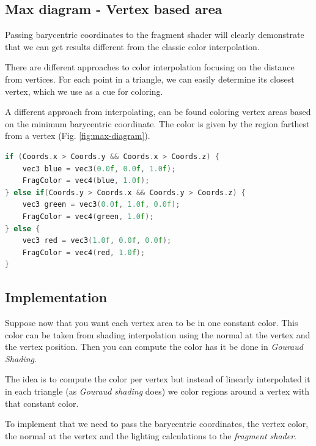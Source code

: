 \subsection{Max diagram - Vertex based area}
Passing barycentric coordinates to the fragment shader will clearly demonstrate that we can get results different from the classic color interpolation.

There are different approaches to color interpolation focusing on the distance from vertices. For each point in a triangle, we can easily determine its closest vertex, which we use as a cue for coloring.

A different approach from interpolating, can be found coloring vertex areas based on the minimum barycentric coordinate.
The color is given by the region farthest from a vertex (Fig. \ref{fig:max-diagram}).

\begin{lstlisting}[language=C++,
    directivestyle={\color{black}}
    emph={int,char,double,float,unsigned},
    emphstyle={\color{blue}}
   ]
if (Coords.x > Coords.y && Coords.x > Coords.z) {
    vec3 blue = vec3(0.0f, 0.0f, 1.0f);
    FragColor = vec4(blue, 1.0f);
} else if(Coords.y > Coords.x && Coords.y > Coords.z) {
    vec3 green = vec3(0.0f, 1.0f, 0.0f);
    FragColor = vec4(green, 1.0f);
} else {
    vec3 red = vec3(1.0f, 0.0f, 0.0f);
    FragColor = vec4(red, 1.0f);
}
\end{lstlisting}

\subsection{Implementation}
Suppose now that you want each vertex area to be in one constant color. This color can be taken from shading interpolation using the normal at the vertex and the vertex position. Then you can compute the color has it be done in \textit{Gouraud Shading}.

The idea is to compute the color per vertex but instead of linearly interpolated it in each triangle (as \textit{Gouraud shading} does) we color regions around a vertex with that constant color.

To implement that we need to pass the barycentric coordinates, the vertex color, the normal at the vertex and the lighting calculations to the \textit{fragment shader}.

